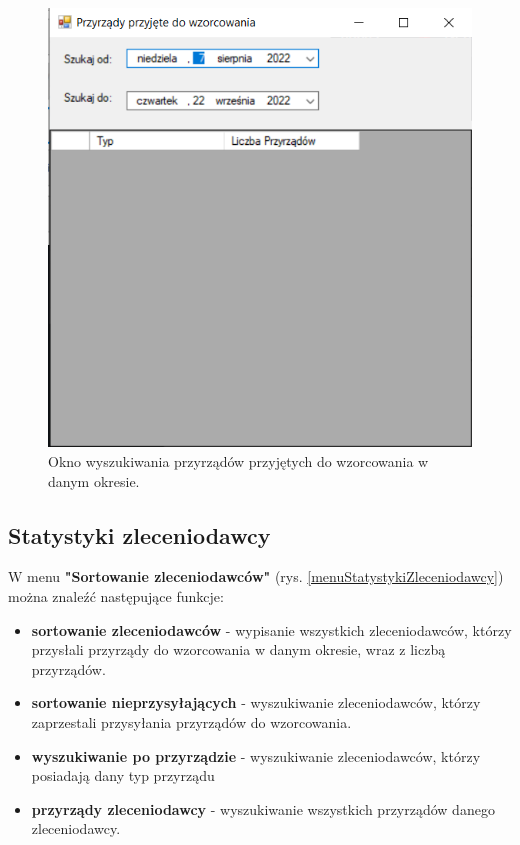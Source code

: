 \begin{figure}[htb]
	\centering
	\includegraphics{obrazki/Wyszukiwanie/przyrzady_przyjete.png}
	\caption{Okno wyszukiwania przyrządów przyjętych do wzorcowania w danym okresie.}
	\label{przyrzadyPrzyjete}
\end{figure}

\subsection{Statystyki zleceniodawcy}
\label{stat_zleceniodawcy}

W menu \textbf{"Sortowanie zleceniodawców"} (rys. \ref{menuStatystykiZleceniodawcy}) można znaleźć następujące funkcje:
	\begin{itemize}
		\item \textbf{sortowanie zleceniodawców} - wypisanie wszystkich zleceniodawców, którzy przysłali przyrządy do wzorcowania w danym okresie, wraz z liczbą przyrządów.
		\item \textbf{sortowanie nieprzysyłających} - wyszukiwanie zleceniodawców, którzy zaprzestali przysyłania przyrządów do wzorcowania.
		\item \textbf{wyszukiwanie po przyrządzie} - wyszukiwanie zleceniodawców, którzy posiadają dany typ przyrządu
		\item \textbf{przyrządy zleceniodawcy} - wyszukiwanie wszystkich przyrządów danego zleceniodawcy.
	\end{itemize}

